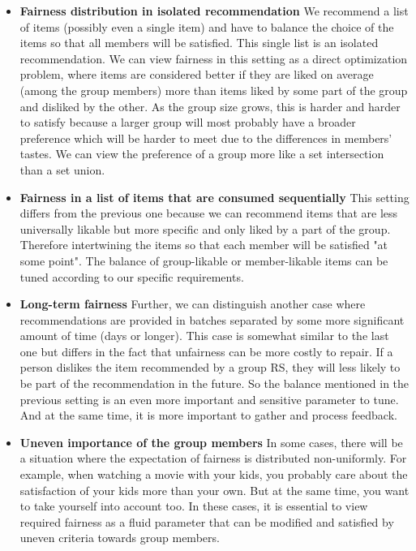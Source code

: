 \begin{itemize}
    \item \textbf{Fairness distribution in isolated recommendation}\newline
    We recommend a list of items (possibly even a single item) and have to balance the choice of the items so that all members will be satisfied. This single list is an isolated recommendation. We can view fairness in this setting as a direct optimization problem, where items are considered better if they are liked on average (among the group members) more than items liked by some part of the group and disliked by the other. As the group size grows, this is harder and harder to satisfy because a larger group will most probably have a broader preference which will be harder to meet due to the differences in members' tastes. We can view the preference of a group more like a set intersection than a set union.
    
    \item \textbf{Fairness in a list of items that are consumed sequentially}
    This setting differs from the previous one because we can recommend items that are less universally likable but more specific and only liked by a part of the group. Therefore intertwining the items so that each member will be satisfied "at some point". The balance of group-likable or member-likable items can be tuned according to our specific requirements.
    
    \item \textbf{Long-term fairness}\newline
    Further, we can distinguish another case where recommendations are provided in batches separated by some more significant amount of time (days or longer). This case is somewhat similar to the last one but differs in the fact that unfairness can be more costly to repair. If a person dislikes the item recommended by a group RS, they will less likely to be part of the recommendation in the future. So the balance mentioned in the previous setting is an even more important and sensitive parameter to tune. And at the same time, it is more important to gather and process feedback.
    
    \item \textbf{Uneven importance of the group members}
    In some cases, there will be a situation where the expectation of fairness is distributed non-uniformly. For example, when watching a movie with your kids, you probably care about the satisfaction of your kids more than your own. But at the same time, you want to take yourself into account too. In these cases, it is essential to view required fairness as a fluid parameter that can be modified and satisfied by uneven criteria towards group members.
    

\end{itemize}
